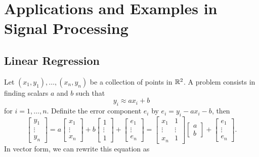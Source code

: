\section{Applications and Examples in Signal Processing}

\subsection{Linear Regression}

Let $(x_1, y_1), \ldots, (x_n, y_n)$ be a collection of points in $\mathbb{R}^2$.
A  problem consists in finding scalars $a$ and $b$ such that
\begin{equation*}
y_i \approx a x_i + b
\end{equation*}
for $i = 1, \ldots, n$.
Definite the error component $e_i$ by $e_i = y_i - a x_i - b$, then
\begin{equation*}
\left[ \begin{array}{c} y_1 \\ \vdots \\ y_n \end{array} \right]
= a \left[ \begin{array}{c} x_1 \\ \vdots \\ x_n \end{array} \right]
+ b \left[ \begin{array}{c} 1 \\ \vdots \\ 1 \end{array} \right]
+ \left[ \begin{array}{c} e_1 \\ \vdots \\ e_n \end{array} \right]
= \left[ \begin{array}{cc} x_1 & 1 \\
\vdots & \vdots \\ x_n & 1 \end{array} \right]
\left[ \begin{array}{c} a \\ b \end{array} \right]
+ \left[ \begin{array}{c} e_1 \\ \vdots \\ e_n \end{array} \right] .
\end{equation*}
In vector form, we can rewrite this equation as
